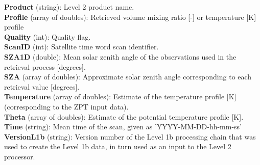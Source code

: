 \textbf{Product} (string): Level 2 product name. \\

\textbf{Profile} (array of doubles): Retrieved volume mixing ratio [-] or temperature [K] profile  \\ %

\textbf{Quality} (int): Quality flag. \\ %

\textbf{ScanID} (int): Satellite time word scan identifier. \\

\textbf{SZA1D} (double): Mean solar zenith angle of the observations used in the retrieval process [degrees]. \\

\textbf{SZA} (array of doubles): Approximate solar zenith angle corresponding to each retrieval value [degrees]. \\ %

\textbf{Temperature} (array of doubles): Estimate of the temperature profile [K] (corresponding to the ZPT input data). \\ %

\textbf{Theta} (array of doubles): Estimate of the potential temperature profile [K]. \\

\textbf{Time} (string): Mean time of the scan, given as 'YYYY-MM-DD-hh-mm-ss' \\ %

\textbf{VersionL1b} (string): Version number of the Level 1b processing chain that was used to create the Level 1b data, in turn used as an input to the Level 2 processor. \\

